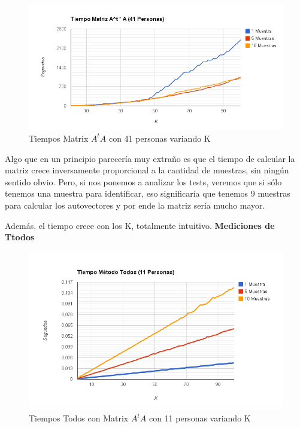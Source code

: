 \begin{figure}[H]
\includegraphics[width=1\textwidth]{img/image3.png}
     \caption{Tiempos Matrix $A^tA$ con 41 personas variando K}
\end{figure}

Algo que en un principio parecería muy extraño es que el tiempo de calcular la matriz crece
inversamente proporcional a la cantidad de muestras, sin ningún sentido obvio. Pero, si nos ponemos
a analizar los tests, veremos que si sólo tenemos una muestra para identificar, eso significaría que
tenemos 9 muestras para calcular los autovectores y por ende la matriz sería mucho mayor.

Además, el tiempo crece con los K, totalmente intuitivo.
\textbf{Mediciones de Ttodos }

\begin{figure}[H]
\includegraphics[width=1\textwidth]{img/image4.png}
     \caption{Tiempos Todos con Matrix $A^tA$ con 11 personas variando K}
\end{figure}

